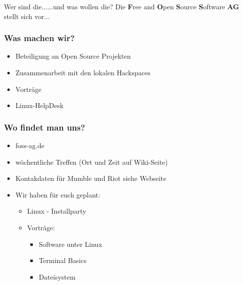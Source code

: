 \begin{frame}{Wer sind die...}{...und was wollen die?}
	Die \textbf{F}ree and \textbf{O}pen \textbf{S}ource \textbf{S}oftware \textbf{AG} stellt sich vor... 
\end{frame}

\begin{frame}
\frametitle{Was machen wir?}
\begin{itemize}
	\item Beteiligung an Open Source Projekten
	\item Zusammenarbeit mit den lokalen Hackspaces
	\item Vorträge
	\item Linux-HelpDesk
\end{itemize}
\end{frame}

\begin{frame}
\frametitle{Wo findet man uns?}
\begin{itemize}
	\item foss-ag.de
	\item wöchentliche Treffen (Ort und Zeit auf Wiki-Seite)
	\item Kontakdaten für Mumble und Riot siehe Webseite
\end{itemize}
\end{frame}

\begin{frame}
\begin{itemize}
	\item Wir haben für euch geplant:
	\begin{itemize}
		\item Linux - Installparty
		\item Vorträge:
		\begin{itemize}
			\item Software unter Linux
			\item Terminal Basics
			\item Dateisystem
		\end{itemize}
	\end{itemize}
\end{itemize}
\end{frame}

